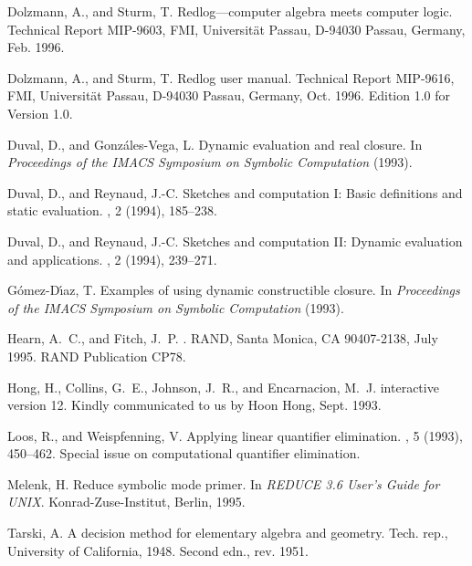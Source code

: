 \begin{thebibliography}{10}
{Dolzmann, A., and Sturm, T.}
\newblock Redlog---computer algebra meets computer logic.
\newblock Technical Report MIP-9603, FMI, Universit\"at Passau, D-94030 Passau,
  Germany, Feb. 1996.

{Dolzmann, A., and Sturm, T.}
\newblock Redlog user manual.
\newblock Technical Report MIP-9616, FMI, Universit\"at Passau, D-94030 Passau,
  Germany, Oct. 1996.
\newblock Edition 1.0 for Version 1.0.

{Duval, D., and Gonz\'ales-Vega, L.}
\newblock Dynamic evaluation and real closure.
\newblock In {\em Proceedings of the IMACS Symposium on Symbolic Computation\/}
  (1993).

{Duval, D., and Reynaud, J.-C.}
\newblock Sketches and computation {I}: Basic definitions and static
  evaluation.
, 2 (1994),
  185--238.

{Duval, D., and Reynaud, J.-C.}
\newblock Sketches and computation {II}: Dynamic evaluation and applications.
, 2 (1994),
  239--271.

{G\'omez-D\'{\i}az, T.}
\newblock Examples of using dynamic constructible closure.
\newblock In {\em Proceedings of the IMACS Symposium on Symbolic Computation\/}
  (1993).

{Hearn, A.~C., and Fitch, J.~P.}
.
\newblock RAND, Santa Monica, CA 90407-2138, July 1995.
\newblock RAND Publication CP78.

{Hong, H., Collins, G.~E., Johnson, J.~R., and Encarnacion, M.~J.}
 interactive version 12.
\newblock Kindly communicated to us by Hoon Hong, Sept. 1993.

{Loos, R., and Weispfenning, V.}
\newblock Applying linear quantifier elimination.
, 5 (1993), 450--462.
\newblock Special issue on computational quantifier elimination.

{Melenk, H.}
\newblock Reduce symbolic mode primer.
\newblock In {\em REDUCE 3.6 User's Guide for UNIX}. Konrad-Zuse-Institut,
  Berlin, 1995.

{Tarski, A.}
\newblock A decision method for elementary algebra and geometry.
\newblock Tech. rep., University of California, 1948.
\newblock Second edn., rev. 1951.


\end{thebibliography}
